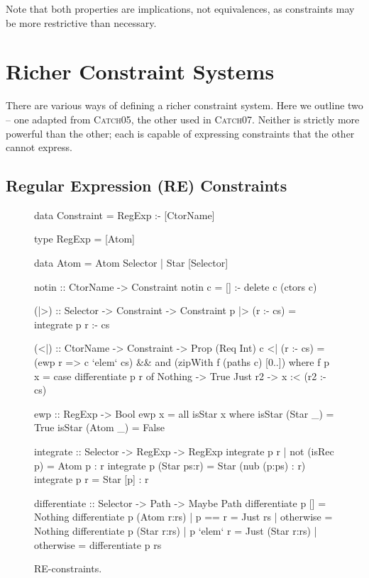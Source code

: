 \documentclass[preprint]{sigplanconf}
\newcommand{\catch}{\textsc{Catch}}
\begin{document}
\noindent Note that both properties are implications, not equivalences, as constraints may be more restrictive than necessary.

\section{Richer Constraint Systems}
\label{sec:constraint}

There are various ways of defining a richer constraint system. Here we outline two -- one adapted from \catch05, the other used in \catch07. Neither is strictly more powerful than the other; each is capable of expressing constraints that the other cannot express.

\subsection{Regular Expression (RE) Constraints}
\label{sec:regexp}

\begin{figure}
\begin{code}
data Constraint = RegExp :- [CtorName]

type RegExp = [Atom]

data Atom  =  Atom  Selector
           |  Star  [Selector]

notin :: CtorName -> Constraint
notin c = [] :- delete c (ctors c)

(|>) :: Selector -> Constraint -> Constraint
p |> (r :- cs) = integrate p r :- cs

(<|) :: CtorName -> Constraint -> Prop (Req Int)
c <| (r :- cs) = (ewp r => c `elem` cs) &&
    and (zipWith f (paths c) [0..])
    where
    f p x = case  differentiate p r of
                  Nothing -> True
                  Just r2 -> x :< (r2 :- cs)

ewp :: RegExp -> Bool
ewp x = all isStar x
   where  isStar (Star  _) = True
          isStar (Atom  _) = False

integrate :: Selector -> RegExp -> RegExp
integrate p r | not (isRec p) = Atom p : r
integrate p (Star ps:r) = Star (nub (p:ps) : r)
integrate p r = Star [p] : r

differentiate :: Selector -> Path -> Maybe Path
differentiate p [] = Nothing
differentiate p (Atom  r:rs)  | p == r     = Just rs
                              | otherwise  = Nothing
differentiate p (Star  r:rs)  | p `elem` r  = Just (Star r:rs)
                              | otherwise   = differentiate p rs
\end{code}
\caption{RE-constraints.}
\label{fig:regexp}
\end{figure}
\end{document}
